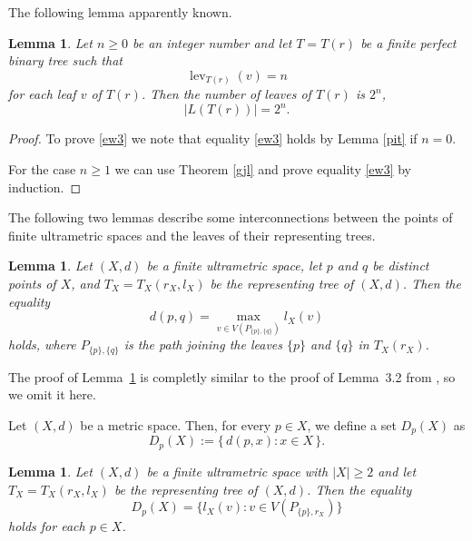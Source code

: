 \documentclass{raex}
\newtheorem{lem}[thm]{Lemma}
\theoremstyle{definition}
\theoremstyle{remark}
\numberwithin{equation}{section}
\begin{document}
The following lemma apparently known.


\begin{lem}\label{rgj}
Let $n \ge 0$ be an integer number and let $T=T(r)$ be a finite perfect binary tree such that
\begin{equation*}
\operatorname{lev}_{T(r)}(v)=n
\end{equation*}
for each leaf $v$ of $T(r)$.
Then the number of  leaves of $T(r)$ is $2^n$,
\begin{equation}
    \label{ew3}
|L(T(r))|=2^n.
\end{equation}
\end{lem}

\begin{proof}
To prove \eqref{ew3} we note that equality
 \eqref{ew3}  holds  by Lemma \ref{pit} if $n=0$.


For the case $n\geq 1$ 
we can use Theorem \ref{gjl} and prove equality \eqref{ew3} by induction.
\end{proof}


The following two lemmas describe some interconnections between the points of finite ultrametric spaces and the leaves of their representing trees.


\begin{lem} \label{UT2Lemma1}
Let $(X,d)$ be a finite ultrametric space, let $p$ and $q$ be distinct points of $X$, and $T_X = T_X(r_X, l_X)$ be the representing tree of $(X,d)$. Then the equality
\begin{equation*}
d(p,q) = \max_{v \in V(P_{\{p\},\{q\}})} l_X(v)
\end{equation*}
holds, where $P_{\{p\},\{q\}}$ is the path joining the leaves $\{p\}$ and $\{q\}$ in $T_X(r_X)$.
\end{lem}

The proof of Lemma~\ref{UT2Lemma1} is completly similar to the proof of Lemma~3.2 from \cite{PD2014JMS}, so we omit it here.




Let $(X,d)$ be a metric space. Then, for every $p \in X$, we define a set $D_p(X)$ as
\begin{equation}
    \label{mkkggd}
D_p(X) := \{\, d(p,x) : x \in X \,\}.
\end{equation}


\begin{lem} \label{UT2Lemma2}
 Let $(X,d)$ be a finite ultrametric space with $|X|\geq 2$ and let $T_X = T_X(r_X,l_X)$ be the representing tree of $(X,d)$. Then the equality
\begin{equation}\label{iuhds}
D_p(X)=\{l_X(v):v\in V(P_{\{p\},r_X})\}
\end{equation}
holds for each $p \in X$.
\end{lem}
\end{document}
